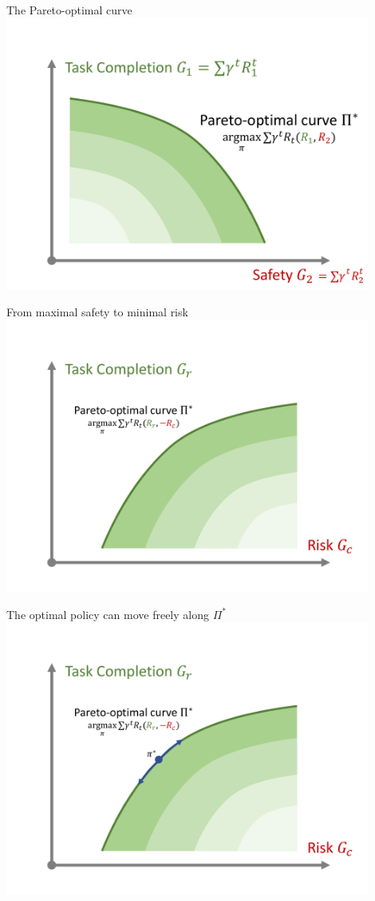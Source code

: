 \documentclass[slideopt,A4,showboxes,svgnames]{beamer}
\begin{document}
\begin{frame}{The Pareto-optimal curve}
\centering
\includegraphics[width=0.9\textwidth]{img/pareto1}
\end{frame}
\begin{frame}{From maximal safety to minimal risk}
\centering
\includegraphics[width=0.9\textwidth]{img/pareto2}
\end{frame}
\begin{frame}{The optimal policy can move freely along $\Pi^*$}
\centering
\includegraphics[width=0.9\textwidth]{img/pareto3}
\end{frame}
\end{document}
